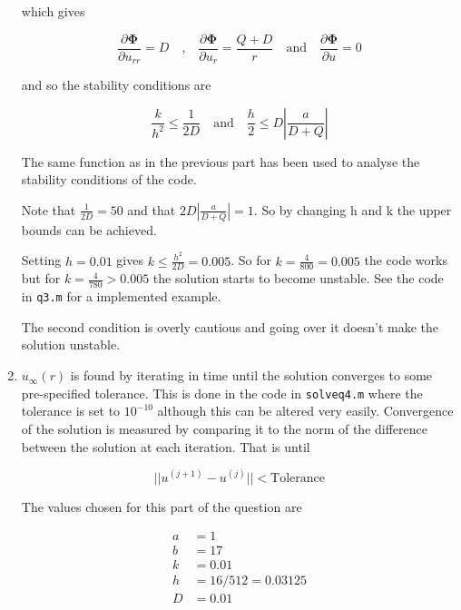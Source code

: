 \documentclass{article}
\begin{document}
\begin{enumerate}
	which gives 
	
	\begin{equation}
		\frac{\partial \boldsymbol{\Phi}}{\partial u_{rr}} = D \quad \text{,} \quad \frac{\partial \boldsymbol{\Phi}}{\partial u_{r}} = \frac{Q+D}{r} \quad \text{and} \quad \frac{\partial \boldsymbol{\Phi}}{\partial u} = 0
	\end{equation}
	
	and so the stability conditions are 
	
	\begin{equation}
		\frac{k}{h^2} \leq \frac{1}{2D} \quad \text{and} \quad \frac{h}{2} \leq D|\frac{a}{D+Q}|
	\end{equation}
	
	The same function as in the previous part has been used to analyse the stability conditions of the code.
	
	Note that $\frac{1}{2D} = 50$ and that $2D|\frac{a}{D+Q}| = 1$. So by changing h and k the upper bounds can be achieved.
	
	Setting $h = 0.01$ gives $k \leq \frac{h^2}{2D} = 0.005$. So for $k = \frac{4}{800} = 0.005$ the code works but for $k = \frac{4}{780} > 0.005$ the solution starts to become unstable. See the code in \texttt{q3.m} for a implemented example.
	
	The second condition is overly cautious and going over it doesn't make the solution unstable.
	

	\item $u_\infty(r)$ is found by iterating in time until the solution converges to some pre-specified tolerance. This is done in the code in \texttt{solveq4.m} where the tolerance is set to $10^{-10}$ although this can be altered very easily. Convergence of the solution is measured by comparing it to the norm of the difference between the solution at each iteration. That is until

	\begin{equation}
		||u^{(j+1)} - u^{(j)}|| < \text{Tolerance}
	\end{equation}
	
	The values chosen for this part of the question are
	
	\begin{equation}
		\begin{split}
			a &= 1\\
			b &= 17\\
			k &= 0.01\\
			h &= 16/512 = 0.03125\\
			D &= 0.01
		\end{split}
	\end{equation}
	

\end{enumerate}
\end{document}
